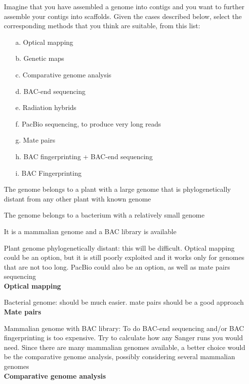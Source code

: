 \begin{Exercise} [
  label={ex25},
  origin={G. Valle}
 ]

Imagine that you have assembled a genome into contigs and you want to further
assemble your contigs into scaffolds. Given the cases described below, select
the corresponding methods that you think are suitable, from this list:
\begin{enumerate}
\item [a.] Optical mapping
\item [b.] Genetic maps
\item [c.] Comparative genome analysis
\item [d.] BAC-end sequencing
\item [e.] Radiation hybrids
\item [f.] PacBio sequencing, to produce very long reads
\item [g.] Mate pairs
\item [h.] BAC fingerprinting + BAC-end sequencing
\item [i.] BAC Fingerprinting
\end{enumerate} 

\Question The genome belongs to a plant with a large genome that is
phylogenetically distant from any other plant with known genome

\Question The genome belongs to a bacterium with a relatively small genome

\Question It is a mammalian genome and a BAC library is available

\end{Exercise}

\begin{Answer} [
  ref={ex25},
  number={1}
 ]

\Question Plant genome phylogenetically distant: this will be difficult.
Optical mapping could be an option, but it is still poorly exploited and it
works only for genomes that are not too long. PacBio could also be an option,
as well as mate pairs sequencing\\\textbf{Optical mapping}

\Question Bacterial genome: should be much easier. mate pairs should be a good
approach\\\textbf{Mate pairs}

\Question Mammalian genome with BAC library: To do BAC-end sequencing and/or
BAC fingerprinting is too expensive. Try to calculate how any Sanger runs you
would need. Since there are many mammalian genomes available, a better choice
would be the comparative genome analysis, possibly considering several
mammalian genomes\\\textbf{Comparative genome analysis}

\end{Answer}

